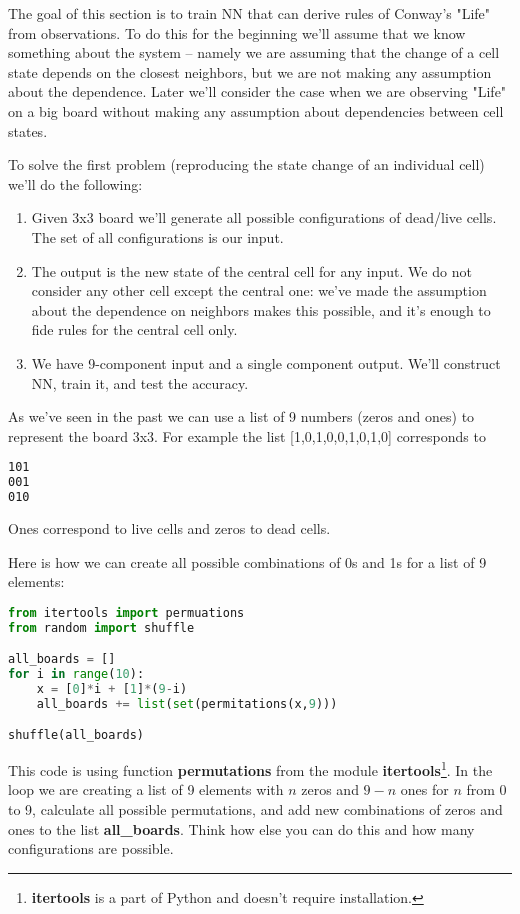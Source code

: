 The goal of this section is to train NN that can derive
rules of Conway's "Life" from observations. To do this
for the beginning we'll assume that we know something about
the system -- namely we are assuming that the change of a cell state
depends on the closest neighbors, but we are not making
any assumption about the dependence. Later we'll consider the case
when we are observing "Life" on a big board without making
any assumption about dependencies between cell states.

To solve the first problem (reproducing the state change
of an individual cell) we'll do the following:
\begin{enumerate}
\item Given 3x3 board we'll generate all possible configurations
of dead/live cells. The set of all configurations is our input.
\item The output is the new state of the central cell for any
input. We do not consider any other cell except the central one:
we've made the assumption about the dependence on neighbors makes
this possible, and it's enough to fide rules for the central cell
only.
\item We have 9-component input and a single component output.
We'll construct NN, train it, and test the accuracy.
\end{enumerate}

As we've seen in the past we can use a list of 9 numbers
(zeros and ones) to represent the board 3x3. For example
the list [1,0,1,0,0,1,0,1,0] corresponds to
\begin{lstlisting}[language=bash]
101
001
010
\end{lstlisting}
Ones correspond to live cells and zeros to dead cells.

Here is how we can create all possible combinations of 0s and 1s
for a list of 9 elements:
\begin{lstlisting}[language=Python,style=codelst2,caption={All 0-1 combinations on a board 3x3}]
from itertools import permuations
from random import shuffle

all_boards = []
for i in range(10):
    x = [0]*i + [1]*(9-i)
    all_boards += list(set(permitations(x,9)))

shuffle(all_boards)
\end{lstlisting}
This code is using function \textbf{permutations} from the module
\textbf{itertools}\footnote{\textbf{itertools} is a part of Python and 
doesn't require installation.}. In the loop we are creating a list
of 9 elements with $n$ zeros and $9-n$ ones for $n$ from 0 to 9,
calculate all possible permutations, and add new combinations
of zeros and ones to the list \textbf{all_boards}.
Think how else you can do this and how many configurations are possible.

